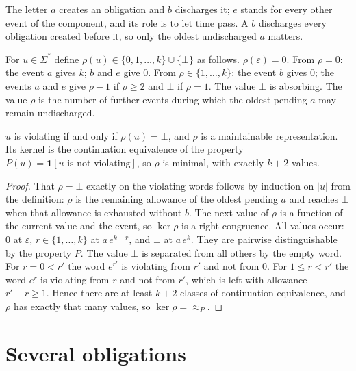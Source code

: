 The letter $a$ creates an obligation and $b$ discharges it; $e$ stands for every other event of the component, and its role is to let time pass. A $b$ discharges every obligation created before it, so only the oldest undischarged $a$ matters.

\begin{definition}\label{def:monitor-state}
For $u\in\Sigma^{*}$ define $\rho(u)\in\{0,1,\dots,k\}\cup\{\bot\}$ as follows. $\rho(\varepsilon)=0$. From $\rho=0$: the event $a$ gives $k$; $b$ and $e$ give $0$. From $\rho\in\{1,\dots,k\}$: the event $b$ gives $0$; the events $a$ and $e$ give $\rho-1$ if $\rho\ge2$ and $\bot$ if $\rho=1$. The value $\bot$ is absorbing. The value $\rho$ is the number of further events during which the oldest pending $a$ may remain undischarged.
\end{definition}

\begin{newresult}\label{prop:single-monitor}
$u$ is violating if and only if $\rho(u)=\bot$, and $\rho$ is a maintainable representation. Its kernel is the continuation equivalence of the property $P(u)=\mathbf 1[u\text{ is not violating}]$, so $\rho$ is minimal, with exactly $k+2$ values.
\end{newresult}
\begin{proof}
That $\rho=\bot$ exactly on the violating words follows by induction on $|u|$ from the definition: $\rho$ is the remaining allowance of the oldest pending $a$ and reaches $\bot$ when that allowance is exhausted without $b$. The next value of $\rho$ is a function of the current value and the event, so $\ker\rho$ is a right congruence. All values occur: $0$ at $\varepsilon$, $r\in\{1,\dots,k\}$ at $a\,e^{k-r}$, and $\bot$ at $a\,e^{k}$. They are pairwise distinguishable by the property $P$. The value $\bot$ is separated from all others by the empty word. For $r=0<r'$ the word $e^{r'}$ is violating from $r'$ and not from $0$. For $1\le r<r'$ the word $e^{r}$ is violating from $r$ and not from $r'$, which is left with allowance $r'-r\ge1$. Hence there are at least $k+2$ classes of continuation equivalence, and $\rho$ has exactly that many values, so $\ker\rho={\approx_P}$.
\end{proof}

\section{Several obligations}

